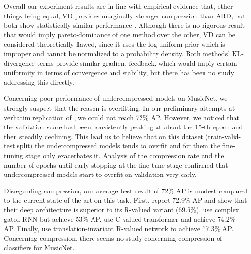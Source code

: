 \documentclass[10pt,a4paper,draft]{article}
\begin{document}
Overall our experiment results are in line with empirical evidence that, other things being
equal, VD provides marginally stronger compression than ARD, but both show statistically similar
performance \cite[tab.1]{kharitonov_variational_2018}. Although there is no rigorous result
that would imply pareto-dominance of one method over the other, VD can be considered
theoretically flawed, since it uses the log-uniform prior which is improper and cannot be
normalized to a probability density. Both methods' KL-divergence terms provide similar
gradient feedback, which would imply certain uniformity in terms of convergence and stability,
but there has been no study addressing this directly.

Concerning poor performance of undercompressed models on MusicNet, we strongly suspect
that the reason is overfitting. In our preliminary attempts at verbatim replication of
\cite{trabelsi_deep_2018}, we could not reach 72\% AP. However, we noticed that the validation
score had been consistently peaking at about the 15-th epoch and then steadily declining.
This lead us to believe that on this dataset (train-valid-test split) the undercompressed
models tends to overfit and for them the fine-tuning stage only exacerbates it. Analysis
of the compression rate and the number of epochs until early-stopping at the fine-tune
stage confirmed that undercompressed models start to overfit on validation very early.

Disregarding compression, our average best result of 72\% AP is modest compared to the current
state of the art on this task. First, \cite{trabelsi_deep_2018} report 72.9\% AP and show
that their deep architecture is superior to its R-valued variant (69.6\%). \cite{wolter_complex_2018}
use complex gated RNN but achieve 53\% AP. \cite{yang_complex_2019} use C-valued transformer
and achieve 74.2\% AP. Finally, \cite{thickstun_invariances_2018} use translation-invariant
R-valued network to achieve 77.3\% AP. Concerning compression, there seems no study concerning
compression of classifiers for MusicNet.


\end{document}

